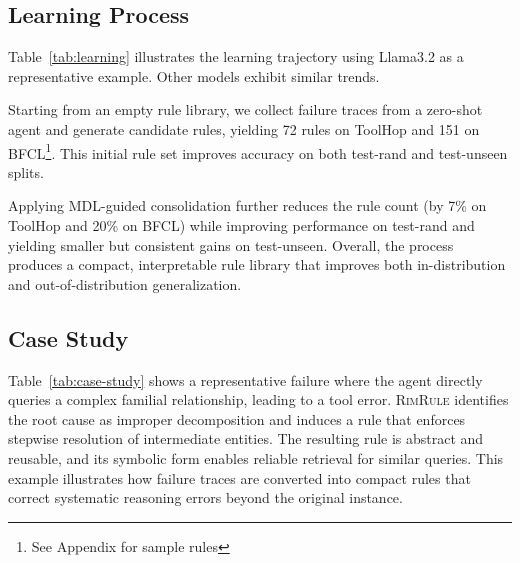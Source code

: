 \documentclass[11pt]{article}
\newcommand{\rand}{{test-rand}\xspace}
\newcommand{\unseen}{{test-unseen}\xspace}
\newcommand{\shortname}{\textsc{RimRule}\xspace}
\begin{document}


\subsection{Learning Process}

Table~\ref{tab:learning} illustrates the learning trajectory using Llama3.2 as a representative
example. Other models exhibit similar trends. 

Starting from an empty rule
library, we collect failure traces from a zero-shot agent and generate candidate rules, yielding 72 rules on ToolHop and 151 on BFCL\footnote{See Appendix for sample rules}. 
This initial rule set improves accuracy on both \rand and
\unseen splits. 

Applying MDL-guided consolidation further reduces the rule count (by 7\% on ToolHop and 20\% on BFCL) while
improving performance on \rand and yielding smaller but consistent gains on \unseen.
Overall, the process produces a compact, interpretable rule library that improves both
in-distribution and out-of-distribution generalization.



\subsection{Case Study}

Table~\ref{tab:case-study} shows a representative failure where the agent directly queries a
complex familial relationship, leading to a tool error. \shortname identifies the root cause
as improper decomposition and induces a rule that enforces stepwise resolution of intermediate
entities. The resulting rule is abstract and reusable, and its symbolic form enables reliable
retrieval for similar queries. This example illustrates how failure traces are converted into
compact rules that correct systematic reasoning errors beyond the original instance.
\end{document}
